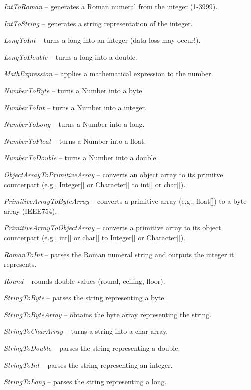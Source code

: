 \begin{tight_itemize}
	\item \textit{IntToRoman} -- generates a Roman numeral from the integer (1-3999).
	\item \textit{IntToString} -- generates a string representation of the integer.
	\item \textit{LongToInt} -- turns a long into an integer (data loss may occur!).
	\item \textit{LongToDouble} -- turns a long into a double.
	\item \textit{MathExpression} -- applies a mathematical expression to the number.
	\item \textit{NumberToByte} -- turns a Number into a byte.
	\item \textit{NumberToInt} -- turns a Number into a integer.
	\item \textit{NumberToLong} -- turns a Number into a long.
	\item \textit{NumberToFloat} -- turns a Number into a float.
	\item \textit{NumberToDouble} -- turns a Number into a double.
	\item \textit{ObjectArrayToPrimitiveArray} -- converts an object array to
	its primitve counterpart (e.g., Integer[] or Character[] to int[] or char[]).
	\item \textit{PrimitiveArrayToByteArray} -- converts a primitive array (e.g., float[]) to a byte array (IEEE754).
	\item \textit{PrimitiveArrayToObjectArray} -- converts a primitive array to
	its object counterpart (e.g., int[] or char[] to Integer[] or Character[]).
	\item \textit{RomanToInt} -- parses the Roman numeral string and outputs the integer it represents.
	\item \textit{Round} -- rounds double values (round, ceiling, floor).
	\item \textit{StringToByte} -- parses the string representing a byte.
	\item \textit{StringToByteArray} -- obtains the byte array representing the string.
  \item \textit{StringToCharArray} -- turns a string into a char array.
	\item \textit{StringToDouble} -- parses the string representing a double.
	\item \textit{StringToInt} -- parses the string representing an integer.
	\item \textit{StringToLong} -- parses the string representing a long.
\end{tight_itemize}
